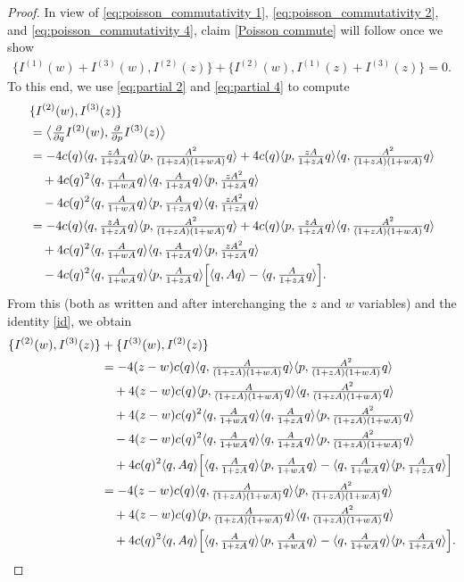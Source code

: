 \documentclass[10pt,a4paper]{amsart}
\newcommand{\la}{\langle}
\newcommand{\ra}{\rangle}
\begin{document}
\begin{proof}
In view of \eqref{eq:poisson_commutativity 1}, \eqref{eq:poisson_commutativity 2}, and \eqref{eq:poisson_commutativity 4}, claim \eqref{Poisson commute} will follow once we show
\begin{align}\label{eq:poisson_commutativity 3}
\{I^{(1)}(w)+I^{(3)}(w),I ^{(2)}(z) \} +	\{I^{(2)}(w),I ^{(1)}(z)+I ^{(3)}(z) \} =0.
\end{align}
To this end, we use \eqref{eq:partial 2} and \eqref{eq:partial 4} to compute
\begin{align*}
&\{I^{(2)}(w),I^{(3)}(z) \} \\
&= \bigl\langle \tfrac{\partial}{\partial q} I^{(2)}(w),\tfrac{\partial}{\partial p} I^{(3)}(z) \bigr\rangle\\
&=-4c(q)\la q, \tfrac{zA}{1+zA}q\ra \la p, \tfrac{A^2}{(1+z A)(1+wA)} q\ra +4c(q)\la p, \tfrac{zA}{1+zA}q\ra \la q, \tfrac{A^2}{(1+z A)(1+wA)} q\ra\\
&\quad +4 c(q)^2 \la q, \tfrac{A}{1+wA}q\ra\la q, \tfrac{A}{1+zA}q\ra\la p, \tfrac{zA^2}{1+zA}q\ra \\
&\quad-4 c(q)^2 \la q, \tfrac{A}{1+wA}q\ra\la p, \tfrac{A}{1+zA}q\ra\la q, \tfrac{zA^2}{1+zA}q\ra\\
&=-4c(q)\la q, \tfrac{zA}{1+zA}q\ra \la p, \tfrac{A^2}{(1+z A)(1+wA)} q\ra +4c(q)\la p, \tfrac{zA}{1+zA}q\ra \la q, \tfrac{A^2}{(1+z A)(1+wA)} q\ra\\
&\quad +4 c(q)^2 \la q, \tfrac{A}{1+wA}q\ra\la q, \tfrac{A}{1+zA}q\ra\la p, \tfrac{zA^2}{1+zA}q\ra \\
&\quad-4 c(q)^2 \la q, \tfrac{A}{1+wA}q\ra\la p, \tfrac{A}{1+zA}q\ra\Bigl[ \la q, Aq\ra-  \la q, \tfrac{A}{1+zA}q\ra\Bigr] .
\end{align*}
From this (both as written and after interchanging the $z$ and $w$ variables) and the identity \eqref{id}, we obtain
\begin{align}\label{441}
\{I^{(2)}(w),I ^{(3)}(z) \} & +\{I^{(3)}(w),I ^{(2)}(z) \} \notag\\
&=-4(z-w)c(q)\la q, \tfrac{A}{(1+z A)(1+wA)}q\ra \la p, \tfrac{A^2}{(1+z A)(1+wA)} q\ra\notag\\
&\quad+4(z-w)c(q)\la p, \tfrac{A}{(1+z A)(1+wA)}q\ra \la q, \tfrac{A^2}{(1+z A)(1+wA)} q\ra\notag\\
&\quad +4 (z-w) c(q)^2 \la q, \tfrac{A}{1+wA}q\ra\la q, \tfrac{A}{1+zA}q\ra\la p, \tfrac{A^2}{(1+zA)(1+wA)}q\ra\notag\\
&\quad- 4(z-w) c(q)^2 \la q, \tfrac{A}{1+wA}q\ra\la q, \tfrac{A}{1+zA}q\ra\la p, \tfrac{A^2}{(1+zA)(1+wA)}q\ra \notag\\
&\quad + 4c(q)^2 \la q,Aq\ra \Bigl[ \la q, \tfrac{A}{1+zA}q\ra \la p, \tfrac{A}{1+wA}q\ra - 
	\la q, \tfrac{A}{1+wA}q\ra \la p, \tfrac{A}{1+zA}q\ra  \Bigr] \notag\\
&=-4(z-w)c(q)\la q, \tfrac{A}{(1+z A)(1+wA)}q\ra \la p, \tfrac{A^2}{(1+z A)(1+wA)} q\ra\\
&\quad+4(z-w)c(q)\la p, \tfrac{A}{(1+z A)(1+wA)}q\ra \la q, \tfrac{A^2}{(1+z A)(1+wA)} q\ra\notag\\
&\quad + 4c(q)^2 \la q,Aq\ra \Bigl[ \la q, \tfrac{A}{1+zA}q\ra \la p, \tfrac{A}{1+wA}q\ra - 
	\la q, \tfrac{A}{1+wA}q\ra \la p, \tfrac{A}{1+zA}q\ra  \Bigr]. \notag
\end{align}



\end{proof}
\end{document}
